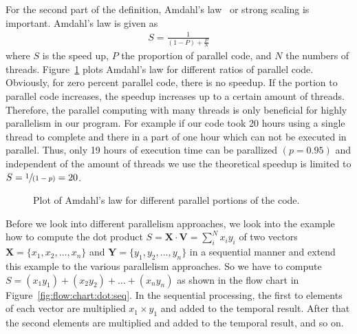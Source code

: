 \documentclass[11pt,fleqn]{book} %
\begin{document}
For the second part of the definition, Amdahl's law~\cite{amdahl1967validity} or strong scaling is important. Amdahl's law is given as
\begin{align}
S = \frac{1}{(1-P) + \frac{P}{N}}
\end{align}
where $S$ is the speed up, $P$ the proportion of parallel code, and $N$ the numbers of threads. Figure~\ref{fig:amdals:law} plots Amdahl's law for different ratios of parallel code. Obviously, for zero percent parallel code, there is no speedup. If the portion to parallel code increases, the speedup increases up to a certain amount of threads. Therefore, the parallel computing with many threads is only beneficial for highly parallelism in our program. For example if our code took 20 hours using a single thread to complete and there in a part of one hour which can not be executed in parallel. Thus, only 19 hours of execution time can be parallized $(p=0.95)$ and independent of the amount of threads we use the theoretical speedup is limited to $S=\sfrac{1}{(1-p)}=20$.\\

\begin{figure}[tb]
\centering
\caption{Plot of Amdahl's law for different parallel portions of the code.}
\label{fig:amdals:law}
\end{figure}

Before we look into different parallelism approaches, we look into the example how to compute the dot product $S = \mathbf{X} \cdot \mathbf{V} = \sum_i^N x_i y_i$ of two vectors $\mathbf{X} = \lbrace x_1,x_2,\ldots,x_n \rbrace$ and $\mathbf{Y} = \lbrace y_1,y_2,\ldots,y_n \rbrace$  in a sequential manner and extend this example to the various parallelism approaches. So we have to compute $S = (x_1y_1) + (x_2y_2) + \ldots + (x_n y_n)$ as shown in the flow chart in Figure~\ref{fig:flow:chart:dot:seq}. In the sequential processing, the first to elements of each vector are multiplied $x_1 \times y_1$ and added to the temporal result. After that the second elements are multiplied and added to the temporal result, and so on. \\
\end{document}
